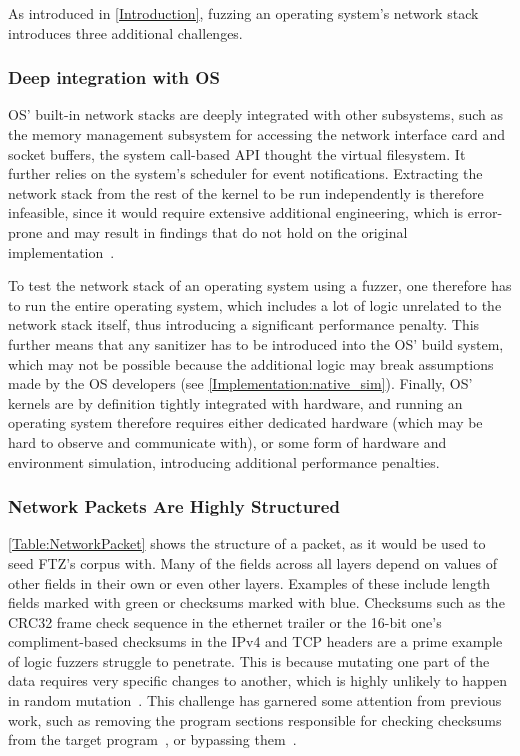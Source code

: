 \documentclass[twocolumn]{article}
\newcommand{\proj}{FTZ\xspace}
\let\savedCite=\cite
\renewcommand{\cite}{\unskip~\savedCite}
\begin{document}
As introduced in \cref{Introduction}, fuzzing an operating system's network stack introduces three additional challenges.

\subsubsection{Deep integration with OS}

OS' built-in network stacks are deeply integrated with other subsystems, such as the memory management subsystem for accessing the network interface card and socket buffers, the system call-based API thought the virtual filesystem. It further relies on the system's scheduler for event notifications. Extracting the network stack from the rest of the kernel to be run independently is therefore infeasible, since it would require extensive additional engineering, which is error-prone and may result in findings that do not hold on the original implementation\cite{KernelVsUserNetworking}.

To test the network stack of an operating system using a fuzzer, one therefore has to run the entire operating system, which includes a lot of logic unrelated to the network stack itself, thus introducing a significant performance penalty. This further means that any sanitizer has to be introduced into the OS' build system, which may not be possible because the additional logic may break assumptions made by the OS developers (see \cref{Implementation:native_sim}). Finally, OS' kernels are by definition tightly integrated with hardware, and running an operating system therefore requires either dedicated hardware (which may be hard to observe and communicate with), or some form of hardware and environment simulation, introducing additional performance penalties.

\subsubsection{Network Packets Are Highly Structured}
\label{Background:TcpIsStructured}

\cref{Table:NetworkPacket} shows the structure of a packet, as it would be used to seed \proj's corpus with. Many of the fields across all layers depend on values of other fields in their own or even other layers. Examples of these include length fields marked with green or checksums marked with blue. Checksums such as the CRC32 frame check sequence in the ethernet trailer or the 16-bit one's compliment-based checksums in the IPv4 and TCP headers are a prime example of logic fuzzers struggle to penetrate. This is because mutating one part of the data requires very specific changes to another, which is highly unlikely to happen in random mutation\cite{StateOfTheArt}. This challenge has garnered some attention from previous work, such as removing the program sections responsible for checking checksums from the target program\cite{TFuzz}, or bypassing them\cite{REDQUEEN}.
\end{document}
